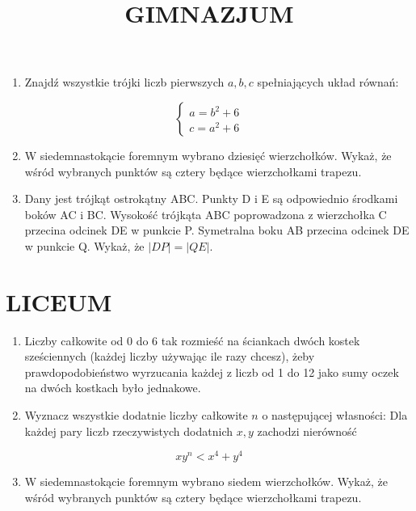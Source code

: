 \documentclass[10pt]{article}
\title{GIMNAZJUM }
\author{}
\date{}
\begin{document}
\maketitle
\begin{enumerate}
  \item Znajdź wszystkie trójki liczb pierwszych \(a, b, c\) spełniających układ równań:
\end{enumerate}

\[
\left\{\begin{array}{l}
a=b^{2}+6 \\
c=a^{2}+6
\end{array}\right.
\]

\begin{enumerate}
  \setcounter{enumi}{1}
  \item W siedemnastokącie foremnym wybrano dziesięć wierzchołków. Wykaż, że wśród wybranych punktów są cztery będące wierzchołkami trapezu.
  \item Dany jest trójkąt ostrokątny ABC. Punkty D i E są odpowiednio środkami boków AC i BC. Wysokość trójkąta ABC poprowadzona z wierzchołka C przecina odcinek DE w punkcie P. Symetralna boku AB przecina odcinek DE w punkcie Q. Wykaż, że \(|D P|=|Q E|\).
\end{enumerate}

\section*{LICEUM}
\begin{enumerate}
  \item Liczby całkowite od 0 do 6 tak rozmieść na ściankach dwóch kostek sześciennych (każdej liczby używając ile razy chcesz), żeby prawdopodobieństwo wyrzucania każdej z liczb od 1 do 12 jako sumy oczek na dwóch kostkach było jednakowe.
  \item Wyznacz wszystkie dodatnie liczby całkowite \(n\) o następującej własności: Dla każdej pary liczb rzeczywistych dodatnich \(x, y\) zachodzi nierówność
\end{enumerate}

\[
x y^{n}<x^{4}+y^{4}
\]

\begin{enumerate}
  \setcounter{enumi}{2}
  \item W siedemnastokącie foremnym wybrano siedem wierzchołków. Wykaż, że wśród wybranych punktów są cztery będące wierzchołkami trapezu.
\end{enumerate}
\end{document}
